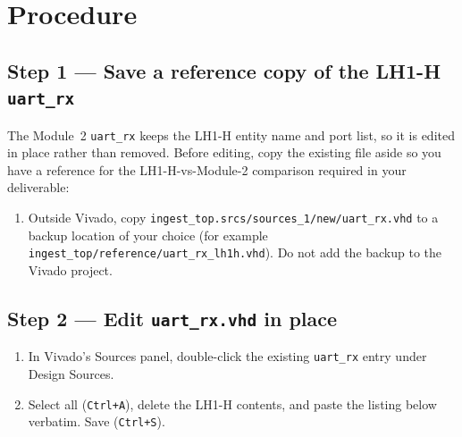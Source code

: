 \documentclass[11pt,letterpaper]{article}
\begin{document}
\section{Procedure}

\subsection{Step 1 --- Save a reference copy of the LH1-H \texttt{uart\_rx}}

The Module~2 \texttt{uart\_rx} keeps the LH1-H entity name and port list, so it is edited in place rather than removed. Before editing, copy the existing file aside so you have a reference for the LH1-H-vs-Module-2 comparison required in your deliverable:

\begin{enumerate}[leftmargin=2em]
	\item Outside Vivado, copy \texttt{ingest\_top.srcs/sources\_1/new/uart\_rx.vhd} to a backup location of your choice (for example \texttt{ingest\_top/reference/uart\_rx\_lh1h.vhd}). Do not add the backup to the Vivado project.
\end{enumerate}

\subsection{Step 2 --- Edit \texttt{uart\_rx.vhd} in place}
\begin{enumerate}[leftmargin=2em]
	\item In Vivado's Sources panel, double-click the existing \texttt{uart\_rx} entry under Design Sources.
	\item Select all (\texttt{Ctrl+A}), delete the LH1-H contents, and paste the listing below verbatim. Save (\texttt{Ctrl+S}).
\end{enumerate}
\end{document}
